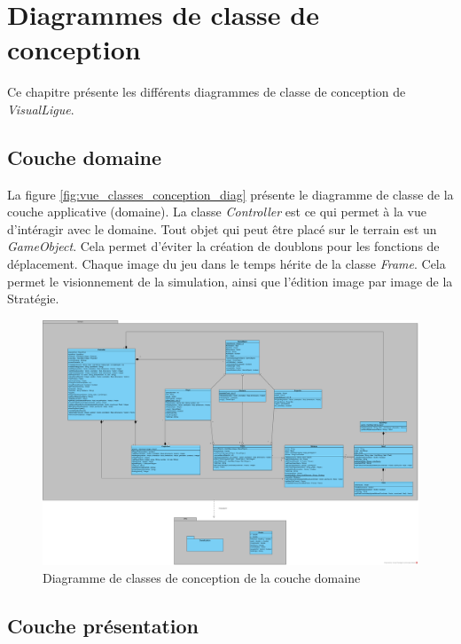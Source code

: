 
\chapter{Diagrammes de classe de conception}
\label{s:classe_conception}

Ce chapitre présente les différents diagrammes de classe de conception de \textit{VisualLigue}.

\section{Couche domaine}
\label{couche_domaine}

La figure \ref{fig:vue_classes_conception_diag} présente le diagramme de classe de la couche applicative (domaine).
La classe \textit{Controller} est ce qui permet à la vue d'intéragir avec le domaine.
Tout objet qui peut être placé sur le terrain est un \textit{GameObject}.
Cela permet d'éviter la création de doublons pour les fonctions de déplacement.
Chaque image du jeu dans le temps hérite de la classe \textit{Frame}.
Cela permet le visionnement de la simulation, ainsi que l'édition image par image de la Stratégie.


\begin{figure}[htpb]
    \centering
    \includegraphics[scale=0.27]{fig/classe_conception_domain.png}
    \caption{Diagramme de classes de conception de la couche domaine}
    \label{fig:domaine_classe}
\end{figure}


\section{Couche présentation}
\label{sec:couche_presentation}


